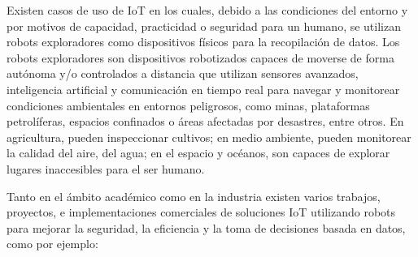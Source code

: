 Existen casos de uso de IoT en los cuales, debido a las condiciones del entorno y por motivos de capacidad, practicidad o seguridad para un humano, se utilizan robots exploradores como dispositivos físicos para la recopilación de datos. Los robots exploradores son dispositivos robotizados capaces de moverse de forma autónoma y/o controlados a distancia que utilizan sensores avanzados, inteligencia artificial y comunicación en tiempo real para navegar y monitorear condiciones ambientales en entornos peligrosos, como minas, plataformas petrolíferas, espacios confinados o áreas afectadas por desastres, entre otros. En agricultura, pueden inspeccionar cultivos; en medio ambiente, pueden monitorear la calidad del aire, del agua; en el espacio y océanos, son capaces de explorar lugares inaccesibles para el ser humano. 


Tanto en el ámbito académico como en la industria existen varios trabajos, proyectos, e implementaciones comerciales de soluciones IoT utilizando robots para mejorar la seguridad, la eficiencia y la toma de decisiones basada en datos, como por ejemplo: 

